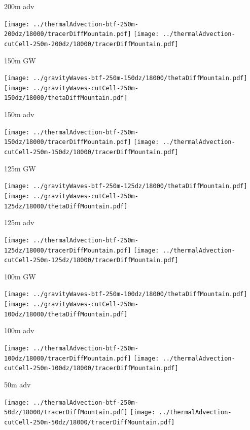 \documentclass{article}
\begin{document}
200m adv

\texttt{[image: ../thermalAdvection-btf-250m-200dz/18000/tracerDiffMountain.pdf]}
\texttt{[image: ../thermalAdvection-cutCell-250m-200dz/18000/tracerDiffMountain.pdf]}

\newpage
150m GW

\texttt{[image: ../gravityWaves-btf-250m-150dz/18000/thetaDiffMountain.pdf]}
\texttt{[image: ../gravityWaves-cutCell-250m-150dz/18000/thetaDiffMountain.pdf]}

150m adv

\texttt{[image: ../thermalAdvection-btf-250m-150dz/18000/tracerDiffMountain.pdf]}
\texttt{[image: ../thermalAdvection-cutCell-250m-150dz/18000/tracerDiffMountain.pdf]}

\newpage

125m GW

\texttt{[image: ../gravityWaves-btf-250m-125dz/18000/thetaDiffMountain.pdf]}
\texttt{[image: ../gravityWaves-cutCell-250m-125dz/18000/thetaDiffMountain.pdf]}

125m adv

\texttt{[image: ../thermalAdvection-btf-250m-125dz/18000/tracerDiffMountain.pdf]}
\texttt{[image: ../thermalAdvection-cutCell-250m-125dz/18000/tracerDiffMountain.pdf]}

\newpage

100m GW

\texttt{[image: ../gravityWaves-btf-250m-100dz/18000/thetaDiffMountain.pdf]}
\texttt{[image: ../gravityWaves-cutCell-250m-100dz/18000/thetaDiffMountain.pdf]}

100m adv

\texttt{[image: ../thermalAdvection-btf-250m-100dz/18000/tracerDiffMountain.pdf]}
\texttt{[image: ../thermalAdvection-cutCell-250m-100dz/18000/tracerDiffMountain.pdf]}

\newpage

50m adv

\texttt{[image: ../thermalAdvection-btf-250m-50dz/18000/tracerDiffMountain.pdf]}
\texttt{[image: ../thermalAdvection-cutCell-250m-50dz/18000/tracerDiffMountain.pdf]}
\end{document}
